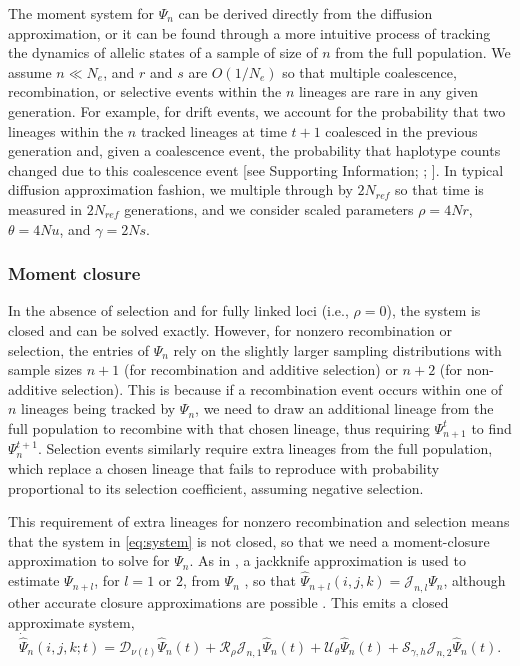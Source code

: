 \documentclass[]{article}
\begin{document}
The moment system for \(\Psi_n\) can be derived directly from the diffusion
approximation, or it can be found through a more intuitive process of tracking
the dynamics of allelic states of a sample of size of \(n\) from the full
population. We assume \(n \ll N_e\), and \(r\) and \(s\) are \(O(1/N_e)\) so that
multiple coalescence, recombination, or selective events within the \(n\)
lineages are rare in any given generation. For example, for drift events, we
account for the probability that two lineages within the \(n\) tracked lineages
at time \(t+1\) coalesced in the previous generation and, given a coalescence
event, the probability that haplotype counts changed due to this coalescence
event {[}see Supporting Information; \citet{Jouganous2017-pq}; \citet{Ragsdale2019-nt}{]}. In
typical diffusion approximation fashion, we multiple through by \(2N_{ref}\) so
that time is measured in \(2N_{ref}\) generations, and we consider scaled
parameters \(\rho = 4Nr\), \(\theta = 4Nu\), and \(\gamma=2Ns\).

\subsubsection{Moment closure}\label{moment-closure}

In the absence of selection and for fully linked loci (i.e., \(\rho=0\)), the
system is closed and can be solved exactly. However, for nonzero recombination
or selection, the entries of \(\Psi_n\) rely on the slightly larger sampling
distributions with sample sizes \(n+1\) (for recombination and additive
selection) or \(n+2\) (for non-additive selection). This is because if a
recombination event occurs within one of \(n\) lineages being tracked by
\(\Psi_n\), we need to draw an additional lineage from the full population to
recombine with that chosen lineage, thus requiring \(\Psi_{n+1}^t\) to find
\(\Psi_n^{t+1}\). Selection events similarly require extra lineages from the full
population, which replace a chosen lineage that fails to reproduce with
probability proportional to its selection coefficient, assuming negative
selection.

This requirement of extra lineages for nonzero recombination and selection
means that the system in \eqref{eq:system} is not closed, so that we need a
moment-closure approximation to solve for \(\Psi_n\). As in \citet{Ragsdale2019-nt}, a
jackknife approximation is used to estimate \(\Psi_{n+l}\), for \(l=1\) or \(2\),
from \(\Psi_n\) \citep[following the single-locus closure introduced in][]{Jouganous2017-pq}, so that \(\hat{\Psi}_{n+l}(i, j, k) = \mathcal{J}_{n, l}\Psi_n\), although other accurate closure approximations are possible
\citep{Friedlander2022-bs}. This emits a closed approximate system,
\begin{equation}
\label{eq:closed-system}
\dot{\hat\Psi}_n(i, j, k; t) =
\mathcal{D}_{\nu(t)}\hat\Psi_n(t)
+ \mathcal{R}_{\rho}\mathcal{J}_{n, 1}\hat\Psi_{n}(t)
+ \mathcal{U}_{\theta}\hat\Psi_n(t)
+ \mathcal{S}_{\gamma, h}\mathcal{J}_{n, 2}\hat\Psi_{n}(t).
\end{equation}
\end{document}
